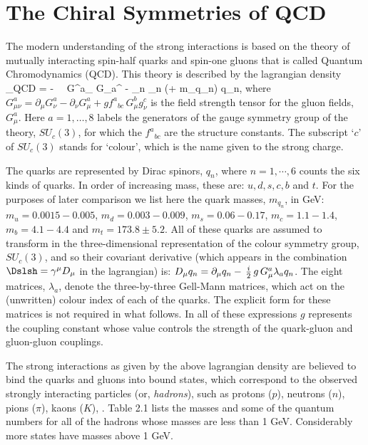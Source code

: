 \documentclass[12pt,epsf]{report}
\begin{document}
\section{The Chiral Symmetries of QCD}

The modern understanding of the strong interactions is
based on the theory of mutually interacting spin-half
quarks and spin-one gluons that is called Quantum
Chromodynamics (QCD). This theory is described by the
lagrangian density 
%
\eq
\label{qcdlagr}
\Scl_{\sss QCD} = - \,  \, G^a_{\mu\nu} 
G_a^{\mu\nu} - \sum_n \qbr_n
(\Dslsh + m_{q_n}) q_n,
\eeq
%
where $G^a_{\mu\nu} = \partial_\mu G^a_\nu - \partial_\nu 
G^a_\mu + g {f^a}_{bc} \, G^b_\mu g^c_\nu$ is the field
strength tensor for the gluon fields, $G^a_\mu$. Here 
$a=1,\dots,8$ labels the generators of the gauge symmetry
group of the theory, $SU_c(3)$, for which the ${f^a}_{bc}$
are the structure constants. The subscript `$c$' of
$SU_c(3)$ stands for `colour', which is the name given to
the strong charge.

The quarks are represented by Dirac spinors, $q_n$, where
$n=1,\cdots,6$ counts the six kinds of quarks. In order of
increasing mass, these are: $u,d,s,c,b$ and $t$. For the
purposes of later comparison we list here the quark masses,
$m_{q_n}$, in GeV: $m_u = 0.0015 - 0.005$, 
$m_d = 0.003 - 0.009$, $m_s = 0.06 - 0.17$,
$m_c = 1.1 - 1.4$, $m_b = 4.1 - 4.4$ and 
$m_t = 173.8 \pm 5.2$. All of these
quarks are assumed to transform in the three-dimensional
representation of the colour symmetry group, $SU_c(3)$, and
so their covariant derivative (which appears in the
combination $\Dslsh = \gamma^\mu 
D_\mu$ in the lagrangian) is: $D_\mu q_n = \partial_\mu q_n
-\, {i\over 2}\, g\, G^a_\mu \lambda_a q_n$. The eight matrices,
$\lambda_a$, denote the three-by-three Gell-Mann matrices,
which act on the (unwritten) colour index of each of the
quarks. The explicit form for these matrices is not
required in what follows. In all of these expressions $g$
represents the coupling constant whose value controls the
strength of the quark-gluon and gluon-gluon couplings.

The strong interactions as given by the above lagrangian
density are believed to bind the quarks and gluons into
bound states, which correspond to the observed strongly
interacting particles (or, {\em hadrons}), such as protons
($p$), neutrons ($n$), pions 
($\pi$), kaons ($K$), \etc. Table 2.1 lists the masses and
some of the quantum numbers for all of the hadrons whose
masses are less than 1 GeV. Considerably more states have
masses above 1 GeV.
\end{document}
